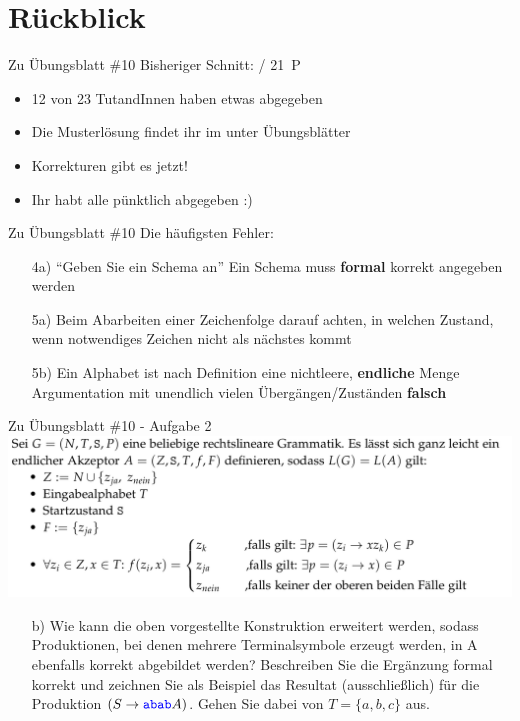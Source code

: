 
\newcommand{\handout}{}



\morescalingdelimiters



\section{Rückblick}

\begin{frame}{Zu Übungsblatt \#10}
	Bisheriger Schnitt:  / 21~P

	\begin{itemize}[<+->]
		\item 12 von 23 TutandInnen haben etwas abgegeben
		\item Die Musterlösung findet ihr im \ILIAS unter Übungsblätter
		\item Korrekturen gibt es jetzt!
		\item Ihr habt alle pünktlich abgegeben :)
	\end{itemize}
\end{frame}

\begin{frame}{Zu Übungsblatt \#10}
	Die häufigsten Fehler:
	\begin{itemize}[<+->]
		\item[4a)] ``Geben Sie ein Schema an''
		\implitem Ein Schema muss \textbf{formal} korrekt angegeben werden
		\item[5a)] Beim Abarbeiten einer Zeichenfolge darauf achten, in welchen Zustand, wenn notwendiges Zeichen nicht als nächstes kommt
		\item[5b)] Ein Alphabet ist nach Definition eine nichtleere, \textbf{endliche} Menge
		\implitem Argumentation mit unendlich vielen Übergängen/Zuständen \textbf{falsch}
	\end{itemize}
\end{frame}

\begin{frame}{Zu Übungsblatt \#10 - Aufgabe 2}
	\includegraphics[width=\textwidth,height=\textheight,keepaspectratio]{UB10_2.png}
	\begin{itemize}[<+->]
		\item[b)] Wie kann die oben vorgestellte Konstruktion erweitert werden, sodass Produktionen, bei denen mehrere Terminalsymbole erzeugt werden, in A ebenfalls korrekt abgebildet werden? Beschreiben Sie die Ergänzung formal korrekt und zeichnen Sie als Beispiel das Resultat (ausschließlich) für die Produktion $(S \to \hbox{\textcolor{blue}{\texttt{abab}}}A)$. Gehen Sie dabei von $T = \{a,b,c\}$ aus.
	\end{itemize}
\end{frame}


